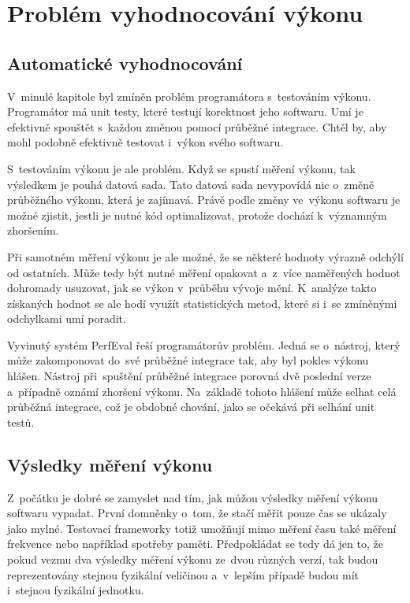\chapter{Problém vyhodnocování výkonu}

\section{Automatické vyhodnocování}
V~minulé kapitole byl zmíněn problém programátora s~testováním výkonu. Programátor má unit
testy, které testují korektnost jeho softwaru. Umí je efektivně spouštět s~každou změnou
pomocí průběžné integrace. Chtěl by, aby mohl podobně efektivně testovat i~výkon svého softwaru.

S~testováním výkonu je ale problém. Když se spustí měření výkonu, tak výsledkem je pouhá
datová sada. Tato datová sada nevypovídá nic o~změně průběžného výkonu, která
je zajímavá. Právě podle změny ve~výkonu softwaru je možné zjistit, jestli je nutné
kód optimalizovat, protože dochází k~významným zhoršením.

Při samotném měření výkonu je ale možné, že se některé hodnoty výrazně odchýlí od ostatních.
Může tedy být nutné měření opakovat a~z~více naměřených hodnot dohromady usuzovat, jak se
výkon v~průběhu vývoje mění. K~analýze takto získaných hodnot se ale hodí využít statistických
metod, které si i~se zmíněnými odchylkami umí poradit.

Vyvinutý systém PerfEval řeší programátorův problém. Jedná se o~nástroj, který může
zakomponovat do~své průběžné integrace tak, aby byl pokles výkonu hlášen. Nástroj
při~spuštění průběžné integrace porovná dvě poslední verze a~případně oznámí zhoršení výkonu.
Na~základě tohoto hlášení může selhat celá průběžná integrace, což je obdobné chování,
jako se očekává při selhání unit testů.

\section{Výsledky měření výkonu}

Z~počátku je dobré se zamyslet nad tím, jak můžou výsledky měření výkonu softwaru vypadat.
První domněnky o~tom, že stačí měřit pouze čas se ukázaly jako mylné. Testovací frameworky
totiž umožňují mimo měření času také měření frekvence nebo například spotřeby paměti.
Předpokládat se tedy dá jen to, že pokud vezmu dva výsledky měření výkonu ze~dvou různých
verzí, tak budou reprezentovány stejnou fyzikální veličinou a~v~lepším případě budou mít
i~stejnou fyzikální jednotku.

